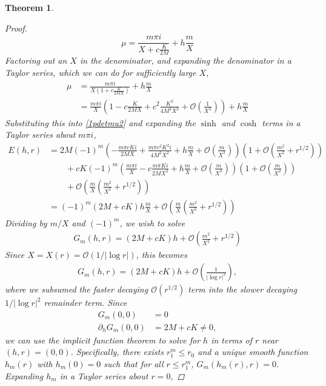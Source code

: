 \documentclass[11pt,reqno]{amsart}
\theoremstyle{plain}
\newtheorem{theorem}{Theorem}
\theoremstyle{definition}
\theoremstyle{remark}
\begin{document}
\begin{theorem}
\begin{proof}
\begin{equation}
\mu = \frac{m \pi i}{X + c \frac{K}{2 M}} + h \frac{m}{X}
\end{equation}
Factoring out an $X$ in the denominator, and expanding the denominator in a Taylor series, which we can do for sufficiently large $X$,
\begin{align*}
\mu &= \frac{m \pi i}{X\left(1  + c \frac{K}{2 M X} \right) } + h \frac{m}{X}\\
&= \frac{m \pi i}{X}\left( 1 - c \frac{K}{2 M X} + c^2 \frac{K^2}{4 M^2 X^2} + \mathcal{O}\left(\frac{1}{X^3}\right) \right) + h \frac{m}{X}
\end{align*}
Substituting this into \cref{1pdetmu2} and expanding the $\sinh$ and $\cosh$ terms in a Taylor series about $m \pi i$,
\begin{align*}
E(h, r) &= 2 M (-1)^m \left( -\frac{m \pi c K i}{2 M X} + \frac{m \pi c^2 K^2 i}{4 M^2 X^2} + h\frac{m}{X} + \mathcal{O}\left(\frac{m}{X^3}\right) \right) \left(1 + \mathcal{O}\left( \frac{m^2}{X^2} + r^{1/2} \right) \right) \\
&\qquad+ c K (-1)^m \left( \frac{m \pi i}{X} - c \frac{m \pi K i}{2 M X^2} + h \frac{m}{X} + \mathcal{O}\left(\frac{m}{X^3}\right) \right) \left( 1 + \mathcal{O}\left(\frac{m}{X^2}\right) \right) \\
&\qquad+ \mathcal{O}\left( \frac{m}{X} \left( \frac{m^2}{X^2} + r^{1/2} \right) \right) \\
&= (-1)^m\left( 2M + cK \right)h \frac{m}{X} + \mathcal{O}\left( \frac{m}{X} \left( \frac{m^2}{X^2} + r^{1/2} \right) \right)
\end{align*}
Dividing by $m/X$ and $(-1)^m$, we wish to solve 
\begin{align*}
G_m(h, r) = \left( 2M + cK \right)h + \mathcal{O}\left( \frac{m^2}{X^2} + r^{1/2} \right)
\end{align*}
Since $X = X(r) = \mathcal{O}(1/|\log r|)$, this becomes
\begin{align*}
G_m(h, r) = \left( 2M + cK \right)h + \mathcal{O}\left( \frac{1}{|\log r|^2} \right),
\end{align*}
where we subsumed the faster decaying $\mathcal{O}(r^{1/2})$ term into the slower decaying $1/|\log r|^2$ remainder term. Since
\begin{align*}
G_m(0,0) &= 0 \\
\partial_h G_m(0,0) &= 2M + cK \neq 0,
\end{align*}
we can use the implicit function theorem to solve for $h$ in terms of $r$ near $(h,r) = (0,0)$. Specifically, there exists $r_1^m \leq r_0$ and a unique smooth function $h_m(r)$ with $h_m(0) = 0$ such that for all $r \leq r_1^m$, $G_m(h_m(r),r) = 0$. Expanding $h_m$ in a Taylor series about $r = 0$,

\end{proof}
\end{theorem}
\end{document}
